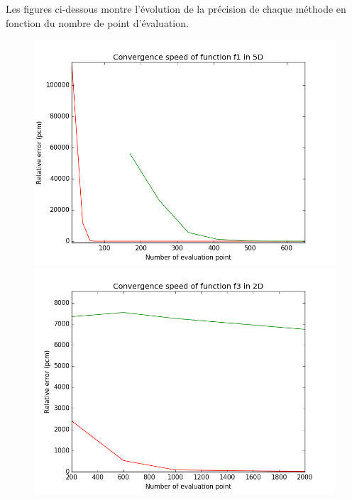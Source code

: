 Les figures ci-dessous montre l'évolution de la précision de chaque méthode en fonction du nombre de point d'évaluation.

\begin{figure}[h]
   \begin{minipage}[b]{0.32\linewidth}
      \centering \includegraphics[scale=0.3]{images/f1_5d.png}
   \end{minipage}
   \begin{minipage}[b]{0.32\linewidth}
      \centering \includegraphics[scale=0.3]{images/f3_2d.png}
   \end{minipage}
   \begin{minipage}[b]{0.32\linewidth}

\end{minipage}
\end{figure}
